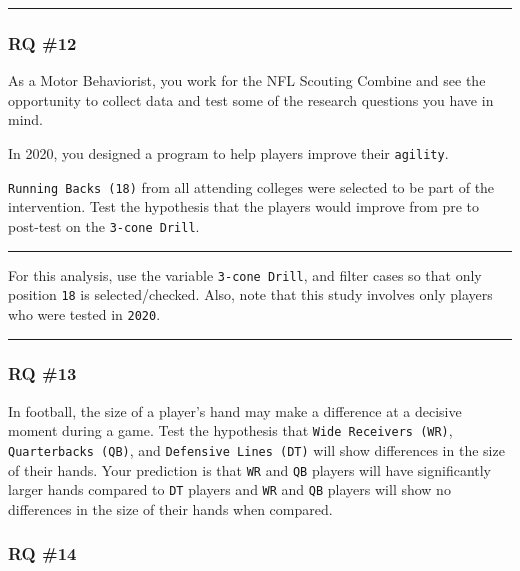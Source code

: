 \documentclass[
]{article}
\begin{document}
\begin{center}\rule{0.5\linewidth}{0.5pt}\end{center}

\hypertarget{rq-12}{%
\subsubsection{RQ \#12}\label{rq-12}}

As a Motor Behaviorist, you work for the NFL Scouting Combine and see the opportunity to collect data and test some of the research questions you have in mind.

In 2020, you designed a program to help players improve their \texttt{agility}.

\texttt{Running\ Backs\ (18)} from all attending colleges were selected to be part of the intervention. Test the hypothesis that the players would improve from pre to post-test on the \texttt{3-cone\ Drill}.

\begin{center}\rule{0.5\linewidth}{0.5pt}\end{center}

For this analysis, use the variable \texttt{3-cone\ Drill}, and filter cases so that only position \texttt{18} is selected/checked. Also, note that this study involves only players who were tested in \texttt{2020}.

\begin{center}\rule{0.5\linewidth}{0.5pt}\end{center}

\hypertarget{rq-13}{%
\subsubsection{RQ \#13}\label{rq-13}}

In football, the size of a player's hand may make a difference at a decisive moment during a game. Test the hypothesis that \texttt{Wide\ Receivers\ (WR)}, \texttt{Quarterbacks\ (QB)}, and \texttt{Defensive\ Lines\ (DT)} will show differences in the size of their hands. Your prediction is that \texttt{WR} and \texttt{QB} players will have significantly larger hands compared to \texttt{DT} players and \texttt{WR} and \texttt{QB} players will show no differences in the size of their hands when compared.

\hypertarget{rq-14}{%
\subsubsection{RQ \#14}\label{rq-14}}
\end{document}
